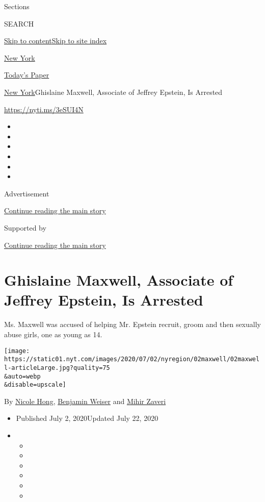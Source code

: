 Sections

SEARCH

\protect\hyperlink{site-content}{Skip to
content}\protect\hyperlink{site-index}{Skip to site index}

\href{https://www.nytimes.com/section/nyregion}{New York}

\href{https://myaccount.nytimes.com/auth/login?response_type=cookie\&client_id=vi}{}

\href{https://www.nytimes.com/section/todayspaper}{Today's Paper}

\href{/section/nyregion}{New York}\textbar{}Ghislaine Maxwell, Associate
of Jeffrey Epstein, Is Arrested

\url{https://nyti.ms/3eSUI4N}

\begin{itemize}
\item
\item
\item
\item
\item
\item
\end{itemize}

Advertisement

\protect\hyperlink{after-top}{Continue reading the main story}

Supported by

\protect\hyperlink{after-sponsor}{Continue reading the main story}

\hypertarget{ghislaine-maxwell-associate-of-jeffrey-epstein-is-arrested}{%
\section{Ghislaine Maxwell, Associate of Jeffrey Epstein, Is
Arrested}\label{ghislaine-maxwell-associate-of-jeffrey-epstein-is-arrested}}

Ms. Maxwell was accused of helping Mr. Epstein recruit, groom and then
sexually abuse girls, one as young as 14.

\texttt{[image: https://static01.nyt.com/images/2020/07/02/nyregion/02maxwell/02maxwell-articleLarge.jpg?quality=75\\\&auto=webp\\\&disable=upscale]}

By \href{https://www.nytimes.com/by/nicole-hong}{Nicole Hong},
\href{https://www.nytimes.com/by/benjamin-weiser}{Benjamin Weiser} and
\href{https://www.nytimes.com/by/mihir-zaveri}{Mihir Zaveri}

\begin{itemize}
\item
  Published July 2, 2020Updated July 22, 2020
\item
  \begin{itemize}
  \item
  \item
  \item
  \item
  \item
  \item
  \end{itemize}
\end{itemize}

